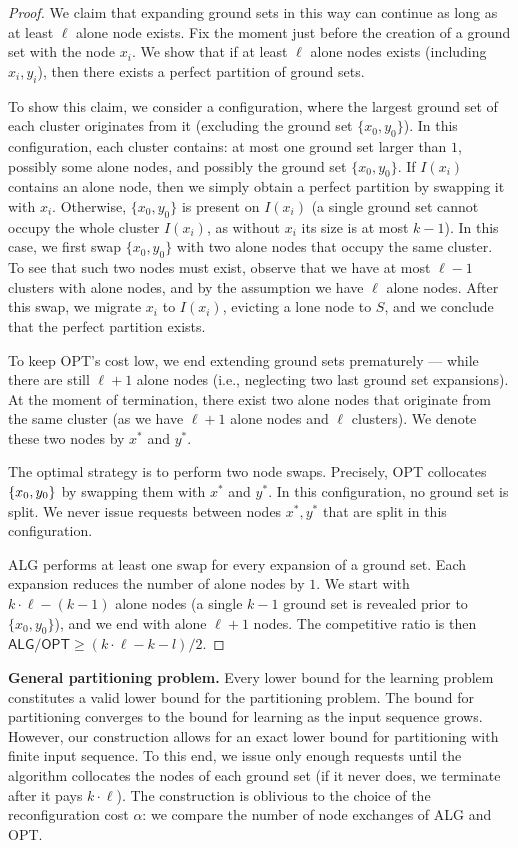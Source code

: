 \documentclass[manuscript,screen=true, review, anonymous]{acmart}
\newcommand{\OPT}{\textsf{OPT}\xspace}
\newcommand{\ALG}{\textsf{ALG}\xspace}
\DeclarePairedDelimiter\set{\{}{\}}
\begin{document}
\begin{proof}
	We claim that expanding ground sets in this way can continue as long as at least $\ell$ alone node exists.
	Fix the moment just before the creation of a ground set with the node $x_i$.
	We show that if at least $\ell$ alone nodes exists (including $x_i, y_i$), then there exists a perfect partition of ground sets.
	
	To show this claim, we consider a configuration, where the largest ground set of each cluster originates from it (excluding the ground set $\{x_0, y_0\}$).
	In this configuration, each cluster contains:  at most one ground set larger than $1$, possibly some alone nodes, and possibly the ground set $\{x_0, y_0\}$.
	If $I(x_i)$ contains an alone node, then we simply obtain a perfect partition by swapping it with $x_i$.
	Otherwise, $\{x_0, y_0\}$ is present on $I(x_i)$ (a single ground set cannot occupy the whole cluster $I(x_i)$, as without $x_i$ its size is at most $k-1$).
	In this case, we first swap $\{x_0, y_0\}$ with two alone nodes that occupy the same cluster.
	To see that such two nodes must exist, observe that we have at most $\ell-1$ clusters with alone nodes, and by the assumption we have $\ell$ alone nodes.
	After this swap, we migrate $x_i$ to $I(x_i)$, evicting a lone node to $S$, and we conclude that the perfect partition exists.
	

	To keep \OPT's cost low, we end extending ground sets prematurely --- while there are still $\ell+1$ alone nodes (i.e., neglecting two last ground set expansions).
	At the moment of termination, there exist two alone nodes that originate from the same cluster (as we have $\ell+1$ alone nodes and $\ell$ clusters).
	We denote these two nodes by $x^*$ and $y^*$.

	The optimal strategy is to perform two node swaps.
	Precisely, \OPT collocates $\set{x_0,y_0}$ by swapping them with $x^*$ and $y^*$.
	In this configuration, no ground set is split.
	We never issue requests between nodes $x^*, y^*$ that are split in this configuration.


	\ALG performs at least one swap for every expansion of a ground set.
	Each expansion reduces the number of alone nodes by $1$.
	We start with $k \cdot \ell - (k-1)$ alone nodes (a single $k-1$ ground set is revealed prior to $\{x_0, y_0\}$), and we end with alone $\ell+1$ nodes.
	The competitive ratio is then $\ALG / \OPT \geq (k\cdot \ell - k - l) / 2$.
\end{proof}


\noindent
\textbf{General partitioning problem.}
Every lower bound for the learning problem constitutes a valid lower bound for the partitioning problem.
The bound for partitioning converges to the bound for learning as the input sequence grows.
However, our construction allows for an exact lower bound for partitioning with finite input sequence.
To this end, we issue only enough requests until the algorithm collocates the nodes of each ground set (if it never does, we terminate after it pays $k\cdot \ell$).
The construction is oblivious to the choice of the reconfiguration cost $\alpha$: we compare the 	number of node exchanges of \ALG and \OPT.
\end{document}
